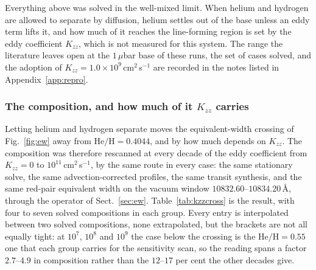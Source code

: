 \documentclass[english,a4paper]{my_memo}
\begin{document}
Everything above was solved in the well-mixed limit. When helium and hydrogen
are allowed to separate by diffusion, helium settles out of the base unless
an eddy term lifts it, and how much of it reaches the line-forming region is
set by the eddy coefficient $K_{zz}$, which is not measured for this system.
The range the literature leaves open at the $1\,\mu$bar base of these runs,
the set of cases solved, and the adoption of
$K_{zz} = 1.0\times10^{9}$\,cm$^2$\,s$^{-1}$ are recorded in the notes listed
in Appendix~\ref{app:repro}.

\subsubsection*{The composition, and how much of it $K_{zz}$ carries}

Letting helium and hydrogen separate moves the equivalent-width crossing of
Fig.~\ref{fig:ew} away from $\mathrm{He/H} = 0.4044$, and by how much depends
on $K_{zz}$. The composition was therefore rescanned at every decade of the
eddy coefficient from $K_{zz} = 0$ to $10^{11}$\,cm$^2$\,s$^{-1}$, by the
same route in every case: the same stationary solve, the same
advection-corrected profiles, the same transit synthesis, and the same
red-pair equivalent width on the vacuum window
$10832.60$--$10834.20$\,\AA, through the operator of Sect.~\ref{sec:ew}.
Table~\ref{tab:kzzcross} is the result, with
four to seven solved compositions in each group. Every entry is interpolated
between two solved compositions, none extrapolated, but the brackets are not
all equally tight: at $10^{7}$, $10^{8}$ and $10^{9}$ the case below the
crossing is the $\mathrm{He/H} = 0.55$ one that each group carries for the
sensitivity scan, so the reading spans a factor $2.7$--$4.9$ in composition
rather than the $12$--$17$ per cent the other decades give.
\end{document}
